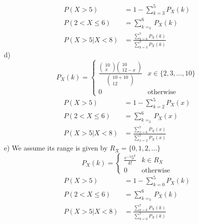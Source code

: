 \begin{align*}
    P(X>5)&=1-\sum_{k=3}^{5}P_{X}(k) \\
    P(2<X\leq 6)&=\sum_{k=_{3}}^{6}P_{X}(k) \\
    P(X>5|X<8)&=\frac{\sum_{k=6}^{7}P_{X}(k)}{\sum_{k=3}^{7}P_{X}(k)}
\end{align*}
d)
\[
    P_{X}(k)=\begin{cases}\frac{\begin{pmatrix}10 \\ x\end{pmatrix}\begin{pmatrix}10 \\ 12-x\end{pmatrix}}{\begin{pmatrix}10+10 \\ 12\end{pmatrix}} & x\in\{2,3,\ldots,10\} \\ 0 & \text{otherwise}\end{cases}
\]
\begin{align*}
    P(X>5)&=1-\sum_{k=2}^{5}P_{X}(x) \\
    P(2<X\leq 6)&=\sum_{k=_{3}}^{6}P_{X}(x) \\
    P(X>5|X<8)&=\frac{\sum_{x=6}^{7}P_{X}(x)}{\sum_{x=2}^{7}P_{X}(x)}
\end{align*}
e)
We assume its range is given by $R_{X}=\{0,1,2,\ldots\}$
\[
    P_{X}(k)=\begin{cases}\frac{e^{-5}5^{k}}{k!} & k\in R_{X} \\ 0 & \text{otherwise}\end{cases}
\]
\begin{align*}
    P(X>5)&=1-\sum_{k=0}^{5}P_{X}(k) \\
    P(2<X\leq 6)&=\sum_{k=_{3}}^{6}P_{X}(k) \\
    P(X>5|X<8)&=\frac{\sum_{k=6}^{7}P_{X}(k)}{\sum_{k=0}^{7}P_{X}(k)}
\end{align*}
